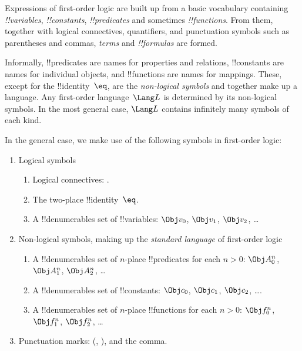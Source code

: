 \documentclass[../../../include/open-logic-section]{subfiles}
\begin{document}



Expressions of first-order logic are built up from a basic vocabulary
containing \emph{!!{variable}s}, \emph{!!{constant}s},
\emph{!!{predicate}s} and sometimes \emph{!!{function}s}.  From them,
together with logical connectives, quantifiers, and punctuation
symbols such as parentheses and commas, \emph{terms} and
\emph{!!{formula}s} are formed.

\begin{explain}
Informally, !!{predicate}s are names for properties and relations,
!!{constant}s are names for individual objects, and !!{function}s are
names for mappings.  These, except for the !!{identity}~$\eq$, are the
\emph{non-logical symbols} and together make up a language.  Any
first-order language~$\Lang L$ is determined by its non-logical
symbols.  In the most general case, $\Lang L$ contains infinitely many
symbols of each kind.
\end{explain}

In the general case, we make use of the following symbols in
first-order logic:

\begin{enumerate}
\item Logical symbols
\begin{enumerate}
\item Logical connectives:
  \startycommalist
  .
\item The two-place !!{identity}~$\eq$.
\item A !!{denumerable}s set of !!{variable}s: $\Obj v_0$, $\Obj v_1$, $\Obj
  v_2$, \dots
\end{enumerate}
\item Non-logical symbols, making up the \emph{standard
  language} of first-order logic
\begin{enumerate}
\item A !!{denumerable}s set of $n$-place !!{predicate}s for each $n>0$: $\Obj
  A^n_0$, $\Obj A^n_1$, $\Obj A^n_2$, \dots
\item A !!{denumerable}s set of !!{constant}s: $\Obj c_0$, $\Obj c_1$, $\Obj
  c_2$, \dots.
\item A !!{denumerable}s set of $n$-place !!{function}s for each $n>0$:
  $\Obj f^n_0$, $\Obj f^n_1$, $\Obj f^n_2$, \dots
\end{enumerate}
\item Punctuation marks: (, ), and the comma.
\end{enumerate}
\end{document}
